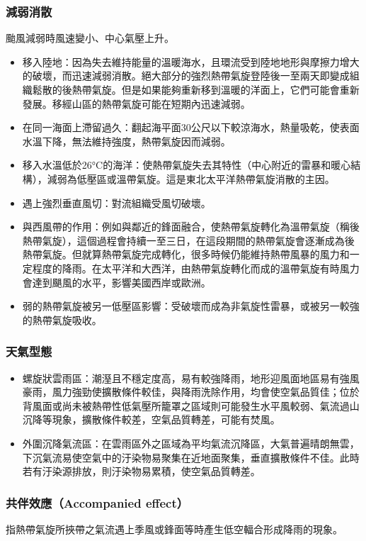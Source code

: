\documentclass[a4paper,12pt]{report}
\begin{document}
\begin{itemize}
\subsubsection{減弱消散}
颱風減弱時風速變小、中心氣壓上升。
\begin{itemize}
  \item 移入陸地：因為失去維持能量的溫暖海水，且環流受到陸地地形與摩擦力增大的破壞，而迅速減弱消散。絕大部分的強烈熱帶氣旋登陸後一至兩天即變成組織鬆散的後熱帶氣旋。但是如果能夠重新移到溫暖的洋面上，它們可能會重新發展。移經山區的熱帶氣旋可能在短期內迅速減弱。
  \item 在同一海面上滯留過久：翻起海平面30公尺以下較涼海水，熱量吸乾，使表面水溫下降，無法維持強度，熱帶氣旋因而減弱。
  \item 移入水溫低於26°C的海洋：使熱帶氣旋失去其特性（中心附近的雷暴和暖心結構），減弱為低壓區或溫帶氣旋。這是東北太平洋熱帶氣旋消散的主因。
  \item 遇上強烈垂直風切：對流組織受風切破壞。
  \item 與西風帶的作用：例如與鄰近的鋒面融合，使熱帶氣旋轉化為溫帶氣旋（稱後熱帶氣旋），這個過程會持續一至三日，在這段期間的熱帶氣旋會逐漸成為後熱帶氣旋。但就算熱帶氣旋完成轉化，很多時候仍能維持熱帶風暴的風力和一定程度的降雨。在太平洋和大西洋，由熱帶氣旋轉化而成的溫帶氣旋有時風力會達到颶風的水平，影響美國西岸或歐洲。
  \item 弱的熱帶氣旋被另一低壓區影響：受破壞而成為非氣旋性雷暴，或被另一較強的熱帶氣旋吸收。
\end{itemize}
\subsubsection{天氣型態}
\begin{itemize}
\item 螺旋狀雲雨區：潮溼且不穩定度高，易有較強降雨，地形迎風面地區易有強風豪雨，風力強勁使擴散條件較佳，與降雨洗除作用，均會使空氣品質佳；位於背風面或尚未被熱帶性低氣壓所籠罩之區域則可能發生水平風較弱、氣流過山沉降等現象，擴散條件較差，空氣品質轉差，可能有焚風。
\item 外圍沉降氣流區：在雲雨區外之區域為平均氣流沉降區，大氣普遍晴朗無雲，下沉氣流易使空氣中的汙染物易聚集在近地面聚集，垂直擴散條件不佳。此時若有汙染源排放，則汙染物易累積，使空氣品質轉差。
\end{itemize}
\subsubsection{共伴效應（Accompanied effect）}
指熱帶氣旋所挾帶之氣流遇上季風或鋒面等時產生低空輻合形成降雨的現象。

\end{itemize}
\end{document}
